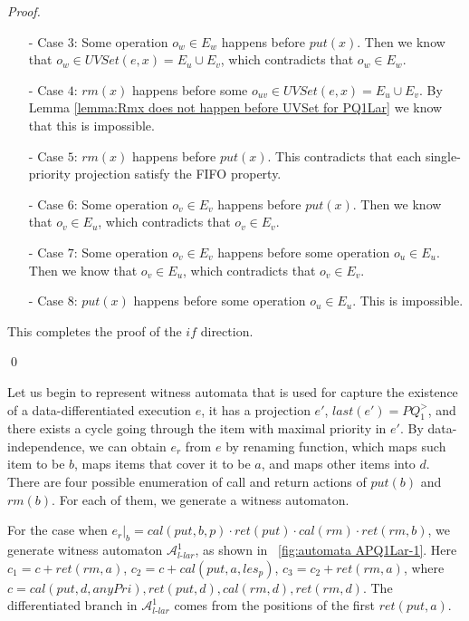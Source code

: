 \begin {proof}
\begin{itemize}
\item[-] Case $3$: Some operation $o_w \in E_w$ happens before $\textit{put}(x)$. Then we know that $o_w \in \textit{UVSet}(e,x) = E_u \cup E_v$, which contradicts that $o_w \in E_w$.

\item[-] Case $4$: $\textit{rm}(x)$ happens before some $o_{\textit{uv}} \in \textit{UVSet}(e,x) = E_u \cup E_v$. By Lemma \ref{lemma:Rmx does not happen before UVSet for PQ1Lar} we know that this is impossible.

\item[-] Case $5$: $\textit{rm}(x)$ happens before $\textit{put}(x)$. This contradicts that each single-priority projection satisfy the FIFO property.

\item[-] Case $6$: Some operation $o_v \in E_v$ happens before $\textit{put}(x)$. Then we know that $o_v \in E_u$, which contradicts that $o_v \in E_v$.

\item[-] Case $7$: Some operation $o_v \in E_v$ happens before some operation $o_u \in E_u$. Then we know that $o_v \in E_u$, which contradicts that $o_v \in E_v$.

\item[-] Case $8$: $\textit{put}(x)$ happens before some operation $o_u \in E_u$. This is impossible.
\end{itemize}

This completes the proof of the $\textit{if}$ direction.

\qed
\end {proof}


Let us begin to represent witness automata that is used for capture the existence of a data-differentiated execution $e$, it has a projection $e'$, $\textit{last}(e') = \textit{PQ}_1^{>}$, and there exists a cycle going through the item with maximal priority in $e'$. By data-independence, we can obtain $e_r$ from $e$ by renaming function, which maps such item to be $b$, maps items that cover it to be $a$, and maps other items into $d$. There are four possible enumeration of call and return actions of $\textit{put}(b)$ and $\textit{rm}(b)$. For each of them, we generate a witness automaton.

For the case when $e_r \vert_{b} = \textit{cal}(\textit{put},b,p) \cdot \textit{ret}(\textit{put}) \cdot \textit{cal}(\textit{rm}) \cdot \textit{ret}(\textit{rm},b)$, we generate witness automaton $\mathcal{A}_{\textit{l-lar}}^1$, as shown in \figurename~\ref{fig:automata APQ1Lar-1}. Here $c_1 = c + \textit{ret}(\textit{rm},a)$, $c_2 = c + \textit{cal}(\textit{put},a,\textit{les}_p)$, $c_3 = c_2 + \textit{ret}(\textit{rm},a)$, where $c = \textit{cal}(\textit{put},d,\textit{anyPri}),\textit{ret}(\textit{put},d), \textit{cal}(\textit{rm},d), \textit{ret}(\textit{rm},d)$. The differentiated branch in $\mathcal{A}_{\textit{l-lar}}^1$ comes from the positions of the first $\textit{ret}(\textit{put},a)$.

